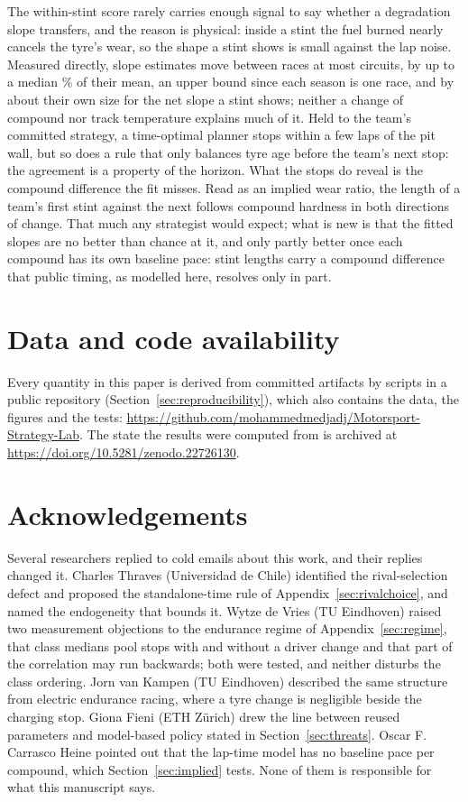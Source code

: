\documentclass[11pt,a4paper]{article}
\begin{document}
The within-stint score rarely carries enough signal to say whether a degradation slope
transfers, and the reason is physical: inside a stint the fuel burned nearly
cancels the tyre's wear, so the shape a stint shows is small against the lap
noise. Measured directly, slope estimates move between races at most circuits,
by up to a median \TauPubShareReml{}\% of their mean, an upper bound since each
season is one race, and by about their own size for the net slope a stint shows; neither a change of compound nor track temperature
explains much of it. Held to the team's committed strategy,
a time-optimal planner stops within a few laps of the pit wall, but so does a
rule that only balances tyre age before the team's next stop: the agreement is
a property of the horizon. What the stops do reveal is the compound difference
the fit misses. Read as an implied wear ratio, the length of a team's first
stint against the next follows compound hardness in both directions of change.
That much any strategist would expect; what is new is that the fitted slopes
are no better than chance at it, and only partly better once each compound has
its own baseline pace: stint lengths carry a compound difference that public
timing, as modelled here, resolves only in part.

\section*{Data and code availability}

Every quantity in this paper is derived from committed artifacts by scripts in
a public repository (Section~\ref{sec:reproducibility}), which also contains the data, the figures and the tests:
\url{https://github.com/mohammedmedjadj/Motorsport-Strategy-Lab}. The state the
results were computed from is archived at
\url{https://doi.org/10.5281/zenodo.22726130}.

\section*{Acknowledgements}

Several researchers replied to cold emails about this work, and their replies
changed it. Charles Thraves (Universidad de Chile) identified the
rival-selection defect and proposed the standalone-time rule of
Appendix~\ref{sec:rivalchoice}, and named the endogeneity that bounds it. Wytze de
Vries (TU Eindhoven) raised two measurement objections to the endurance regime of
Appendix~\ref{sec:regime}, that class
medians pool stops with and without a driver change and that part of the
correlation may run backwards; both were tested, and neither disturbs the class
ordering. Jorn van Kampen (TU Eindhoven) described the same structure from
electric endurance racing, where a tyre change is negligible beside the charging
stop. Giona Fieni (ETH Z\"urich) drew the line between reused parameters and
model-based policy stated in Section~\ref{sec:threats}. Oscar F. Carrasco Heine
pointed out that the lap-time model has no baseline pace per compound, which
Section~\ref{sec:implied} tests. None of them is responsible for what this
manuscript says.
\end{document}
